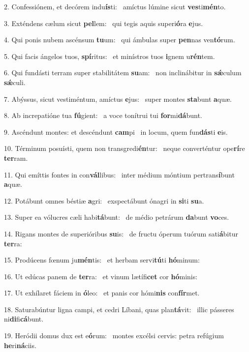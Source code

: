 2. Confessiónem, et decórem indu\textbf{ís}ti: \ast\  amíctus lúmine sicut \textbf{ves}ti\textbf{mén}to.\

3. Exténdens cælum sicut \textbf{pel}lem: \ast\  qui tegis aquis superi\textbf{ó}ra \textbf{e}jus.\

4. Qui ponis nubem ascénsum \textbf{tu}um: \ast\  qui ámbulas super \textbf{pen}nas ven\textbf{tó}rum.\

5. Qui facis ángelos tuos, \textbf{spí}ritus: \ast\  et minístros tuos \textbf{i}gnem u\textbf{rén}tem.\

6. Qui fundásti terram super stabilitátem \textbf{su}am: \ast\  non inclinábitur in \textbf{sǽ}culum \textbf{sǽ}culi.\

7. Abýssus, sicut vestiméntum, amíctus \textbf{e}jus: \ast\  super montes \textbf{sta}bunt \textbf{a}quæ.\

8. Ab increpatióne tua \textbf{fú}gient: \ast\  a voce tonítrui tui \textbf{for}mi\textbf{dá}bunt.\

9. Ascéndunt montes: et descéndunt \textbf{cam}pi \ast\  in locum, quem fun\textbf{dás}ti \textbf{e}is.\

10. Términum posuísti, quem non transgredi\textbf{én}tur: \ast\  neque converténtur ope\textbf{rí}re \textbf{ter}ram.\

11. Qui emíttis fontes in con\textbf{vál}libus: \ast\  inter médium móntium pertrans\textbf{í}bunt \textbf{a}quæ.\

12. Potábunt omnes béstiæ \textbf{a}gri: \ast\  exspectábunt ónagri in \textbf{si}ti \textbf{su}a.\

13. Super ea vólucres cæli habi\textbf{tá}bunt: \ast\  de médio petrárum \textbf{da}bunt \textbf{vo}ces.\

14. Rigans montes de superióribus \textbf{su}is: \ast\  de fructu óperum tuórum sati\textbf{á}bitur \textbf{ter}ra:\

15. Prodúcens fœnum ju\textbf{mén}tis: \ast\  et herbam servi\textbf{tú}ti \textbf{hó}minum:\

16. Ut edúcas panem de \textbf{ter}ra: \ast\  et vinum lætífi\textbf{cet} cor \textbf{hó}minis:\

17. Ut exhílaret fáciem in \textbf{ó}leo: \ast\  et panis cor hómi\textbf{nis} con\textbf{fír}met.\

18. Saturabúntur ligna campi, et cedri Líbani, quas plan\textbf{tá}vit: \ast\  illic pásseres ni\textbf{di}fi\textbf{cá}bunt.\

19. Heródii domus dux est e\textbf{ó}rum: \ast\  montes excélsi cervis: petra refúgium \textbf{he}ri\textbf{ná}ciis.\

